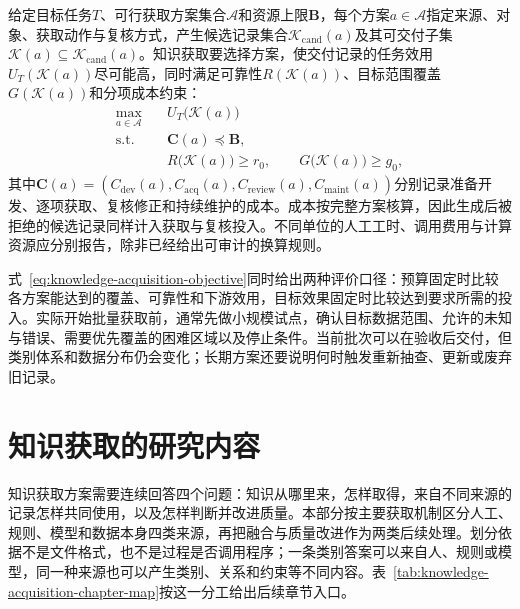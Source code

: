 \begin{definition}[知识获取目标]
  \label{def:knowledge-acquisition-objective}
  给定目标任务$T$、可行获取方案集合$\mathcal{A}$和资源上限$\bm{B}$，每个方案$a\in\mathcal{A}$指定来源、对象、获取动作与复核方式，产生候选记录集合$\mathcal{K}_{\mathrm{cand}}(a)$及其可交付子集$\mathcal{K}(a)\subseteq\mathcal{K}_{\mathrm{cand}}(a)$。知识获取要选择方案，使交付记录的任务效用$U_T(\mathcal{K}(a))$尽可能高，同时满足可靠性$R(\mathcal{K}(a))$、目标范围覆盖$G(\mathcal{K}(a))$和分项成本约束：
  \begin{equation}
    \begin{aligned}
      \max_{a\in\mathcal{A}}\quad
      & U_T\bigl(\mathcal{K}(a)\bigr) \\
      \text{s.t.}\quad
      & \bm{C}(a)\preceq\bm{B}, \\
      & R\bigl(\mathcal{K}(a)\bigr)\geq r_0,\qquad
        G\bigl(\mathcal{K}(a)\bigr)\geq g_0,
    \end{aligned}
    \label{eq:knowledge-acquisition-objective}
  \end{equation}
  其中$\bm{C}(a)=(C_{\mathrm{dev}}(a),C_{\mathrm{acq}}(a),C_{\mathrm{review}}(a),C_{\mathrm{maint}}(a))$分别记录准备开发、逐项获取、复核修正和持续维护的成本。成本按完整方案核算，因此生成后被拒绝的候选记录同样计入获取与复核投入。不同单位的人工工时、调用费用与计算资源应分别报告，除非已经给出可审计的换算规则。
\end{definition}

式~\eqref{eq:knowledge-acquisition-objective}同时给出两种评价口径：预算固定时比较各方案能达到的覆盖、可靠性和下游效用，目标效果固定时比较达到要求所需的投入。实际开始批量获取前，通常先做小规模试点，确认目标数据范围、允许的未知与错误、需要优先覆盖的困难区域以及停止条件。当前批次可以在验收后交付，但类别体系和数据分布仍会变化；长期方案还要说明何时触发重新抽查、更新或废弃旧记录。

\section{知识获取的研究内容}
\label{sec:knowledge-acquisition-research-scope}

知识获取方案需要连续回答四个问题：知识从哪里来，怎样取得，来自不同来源的记录怎样共同使用，以及怎样判断并改进质量。本部分按主要获取机制区分人工、规则、模型和数据本身四类来源，再把融合与质量改进作为两类后续处理。划分依据不是文件格式，也不是过程是否调用程序；一条类别答案可以来自人、规则或模型，同一种来源也可以产生类别、关系和约束等不同内容。表~\ref{tab:knowledge-acquisition-chapter-map}按这一分工给出后续章节入口。

